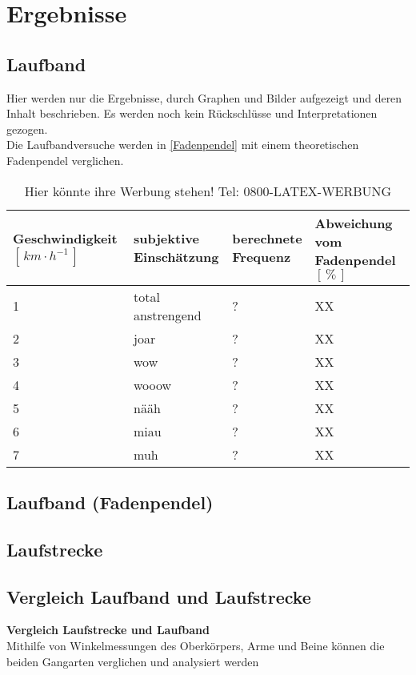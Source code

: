 \section{Ergebnisse}
\subsection{Laufband}
Hier werden nur die Ergebnisse, durch Graphen und Bilder aufgezeigt und deren Inhalt beschrieben. Es werden noch kein Rückschlüsse und Interpretationen gezogen.\\

Die Laufbandversuche werden in \autoref{Fadenpendel} mit einem theoretischen Fadenpendel verglichen.\\
\begin{table}[h!]
\centering
\caption[Vergleich Fadenpendel]{Hier könnte ihre Werbung stehen! Tel: 0800-LATEX-WERBUNG}
\label{Fadenpendel}
\begin{tabular}{C{3.5cm}C{3cm}C{3cm}C{4cm}}
\textbf{Geschwindigkeit $[\,km\cdot h^{-1}\,]$} & \textbf{subjektive \newline Einschätzung} & \textbf{berechnete \newline Frequenz} & \textbf{Abweichung vom \newline Fadenpendel $[\,\%\,]$}\\
 & total anstrengend & ? & XX\\
2 & joar & ? & XX\\
3 & wow & ? & XX\\
4 & wooow & ? & XX\\
5 & nääh & ? & XX\\
6 & miau & ? & XX\\
7 & muh & ? & XX\\
\bottomrule[1.5pt]
\end{tabular}
\end{table}
\subsection{Laufband (Fadenpendel)}
\subsection{Laufstrecke}
\subsection{Vergleich Laufband und Laufstrecke}
\textbf{Vergleich Laufstrecke und Laufband}\\
Mithilfe von Winkelmessungen des Oberkörpers, Arme und Beine können die beiden Gangarten verglichen und analysiert werden\\
